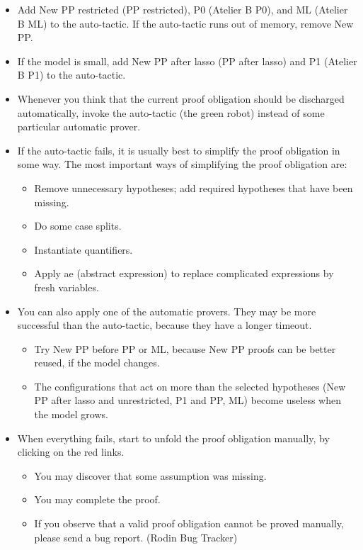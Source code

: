 \begin{itemize}
	\item Add New PP restricted (PP restricted), P0 (Atelier B P0), and ML (Atelier B ML) to the auto-tactic. If the auto-tactic runs out of memory, remove New PP.
	\item If the model is small, add New PP after lasso (PP after lasso) and P1 (Atelier B P1) to the auto-tactic.
	\item Whenever you think that the current proof obligation should be discharged automatically, invoke the auto-tactic (the green robot) instead of some particular automatic prover.
	\item If the auto-tactic fails, it is usually best to simplify the proof obligation in some way. The most important ways of simplifying the proof obligation are:
	\begin{itemize}
		\item Remove unnecessary hypotheses; add required hypotheses that have been missing.
		\item Do some case splits.
		\item Instantiate quantifiers.
		\item Apply ae (abstract expression) to replace complicated expressions by fresh variables. 
	\end{itemize}
	\item You can also apply one of the automatic provers. They may be more successful than the auto-tactic, because they have a longer timeout.
	\begin{itemize}
		\item Try New PP before PP or ML, because New PP proofs can be better reused, if the model changes.
		\item The configurations that act on more than the selected hypotheses (New PP after lasso and unrestricted, P1 and PP, ML) become useless when the model grows. 
	\end{itemize}
	\item When everything fails, start to unfold the proof obligation manually, by clicking on the red links.
	\begin{itemize}
		\item You may discover that some assumption was missing.
		\item You may complete the proof.
		\item If you observe that a valid proof obligation cannot be proved manually, please send a bug report. (Rodin Bug Tracker) 
	\end{itemize}
\end{itemize}


